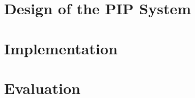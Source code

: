 \documentclass{sig-alternate}
\begin{document}
\section{Design of the PIP System}
\label{sec:design}


\section{Implementation}
\label{sec:implementation}


\section{Evaluation}
\label{sec:evaluation}



\begin{small}


\end{small}
\end{document}
